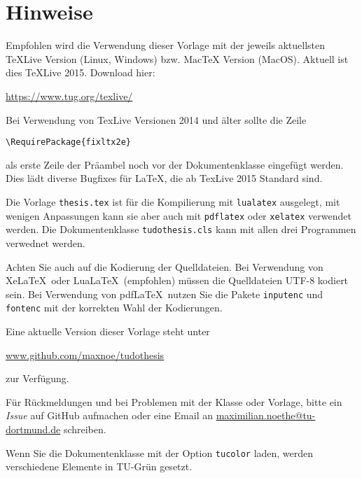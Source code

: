 \thispagestyle{empty}
\setcounter{page}{2}
\section*{Hinweise}
Empfohlen wird die Verwendung dieser Vorlage mit der jeweils aktuellsten TeXLive Version (Linux, Windows) bzw. MacTeX Version (MacOS).
Aktuell ist dies TeXLive 2015. Download hier:
\begin{center}
  \ttfamily\href{https://www.tug.org/texlive/}{https://www.tug.org/texlive/}
\end{center}
Bei Verwendung von TexLive Versionen 2014 und älter sollte
die Zeile
\begin{center}
\verb+\RequirePackage{fixltx2e}+ 
\end{center}
als erste Zeile der Präambel noch vor der Dokumentenklasse eingefügt werden.
Dies lädt diverse Bugfixes für LaTeX, die ab TexLive 2015 Standard sind.

Die Vorlage \texttt{thesis.tex} ist für die Kompilierung mit \texttt{lualatex} ausgelegt, mit wenigen Anpassungen kann sie aber auch mit \texttt{pdflatex} oder \texttt{xelatex} verwendet werden. 
Die Dokumentenklasse \texttt{tudothesis.cls} kann mit allen drei Programmen verwednet werden.

Achten Sie auch auf die Kodierung der Quelldateien.
Bei Verwendung von Xe\LaTeX\ oder Lua\LaTeX\ (empfohlen) müssen die
Quelldateien UTF-8 kodiert sein.
Bei Verwendung von pdf\LaTeX\ nutzen Sie die Pakete \texttt{inputenc} und \texttt{fontenc} mit der korrekten Wahl der Kodierungen.

Eine aktuelle Version dieser Vorlage steht unter 
\begin{center}
  \ttfamily\href{https://github.com/maxnoe/tudothesis}{www.github.com/maxnoe/tudothesis}
\end{center}
zur Verfügung.

Für Rückmeldungen und bei Problemen mit der Klasse oder Vorlage, bitte ein \emph{Issue} auf GitHub aufmachen oder eine Email an
\href{mailto:maximilian.noethe@tu-dortmund.de}{maximilian.noethe@tu-dortmund.de} schreiben.

Wenn Sie die Dokumentenklasse mit der Option \texttt{tucolor} laden, werden verschiedene Elemente in TU-Grün gesetzt.
